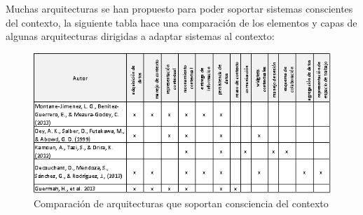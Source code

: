 Muchas arquitecturas se han propuesto para poder soportar sistemas conscientes del contexto, la siguiente tabla hace una comparaci\'on de los elementos y capas de algunas arquitecturas dirigidas a adaptar sistemas al contexto:

\begin{figure}[h!]
  \centering
    \includegraphics[scale=0.9]{images/cmparch}
  \caption{Comparaci\'on de arquitecturas que soportan consciencia del contexto\cite{montane2013context}\cite{dey1999architecture}\cite{kamoun2012fadyrcos}\cite{decouchant2013adapting}\cite{guermah2013ontology}}
\end{figure}
